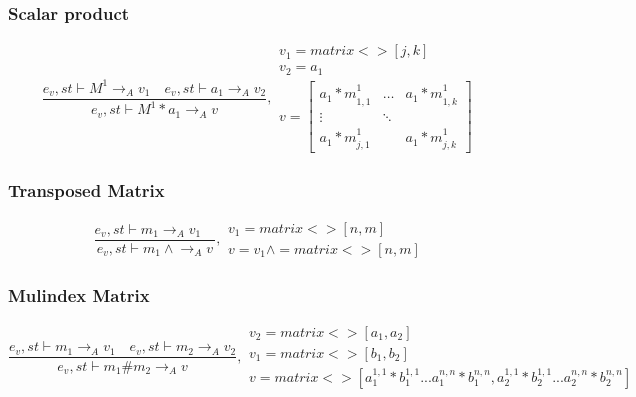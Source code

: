 \subsubsection{Scalar product}
\begin{equation}
	\frac { { e }_{ v },st\vdash { M }^{ 1 }{ \rightarrow  }_{ A }{ v }_{ 1 }\quad { e }_{ v },st\vdash { a }_{ 1 }{ \rightarrow  }_{ A }{ v }_{ 2 } }{ { e }_{ v },st\vdash { M }^{ 1 }\ast { a }_{ 1 }{ \rightarrow  }_{ A }{ v } } ,\begin{matrix} { v }_{ 1 }=matrix<>[j,k] \\ { v }_{ 2 }={ a }_{ 1 } \\ v=\begin{bmatrix} { { a }_{ 1 }*m }_{ 1,1 }^{ 1 } & \dots  & { { a }_{ 1 }*m }_{ 1,k }^{ 1 } \\ \vdots  & \ddots  &  \\ { { a }_{ 1 }*m }_{ j,1 }^{ 1 } &  & { { a }_{ 1 }*m }_{ j,k }^{ 1 } \end{bmatrix} \end{matrix}
\end{equation}

\subsubsection{Transposed Matrix}
\begin{equation}
	\frac { { e }_{ v },st\vdash { m }_{ 1 }{ \rightarrow  }_{ A }{ v }_{ 1 }\quad  }{ { e }_{ v },st\vdash { m }_{ 1 }\wedge { \rightarrow  }_{ A }{ v } } ,\begin{matrix} { v }_{ 1 }=matrix<>[n,m] \\ { v }={ v }_{ 1 }\wedge =matrix<>[n,m] \end{matrix}
\end{equation}

\subsubsection{Mulindex Matrix}
\begin{equation}
	\frac { { e }_{ v },st\vdash { m }_{ 1 }{ \rightarrow  }_{ A }{ v }_{ 1 }\quad { e }_{ v },st\vdash { m }_{ 2 }{ \rightarrow  }_{ A }{ v }_{ 2 } }{ { e }_{ v },st\vdash { m }_{ 1 }\#{ m }_{ 2 }{ \rightarrow  }_{ A }{ v } } ,\begin{matrix} { v }_{ 2 }=matrix<>[{ a }_{ 1 },{ a }_{ 2 }] \\ { v }_{ 1 }=matrix<>[{ b }_{ 1 },{ b }_{ 2 }] \\ v=matrix<>[{ a }_{ 1 }^{ 1,1 }*{ b }_{ 1 }^{ 1,1 }...{ a }_{ 1 }^{ n,n }*{ b }_{ 1 }^{ n,n },{ a }_{ 2 }^{ 1,1 }*{ b }_{ 2 }^{ 1,1 }...{ a }_{ 2 }^{ n,n }*{ b }_{ 2 }^{ n,n }] \end{matrix}
\end{equation}

